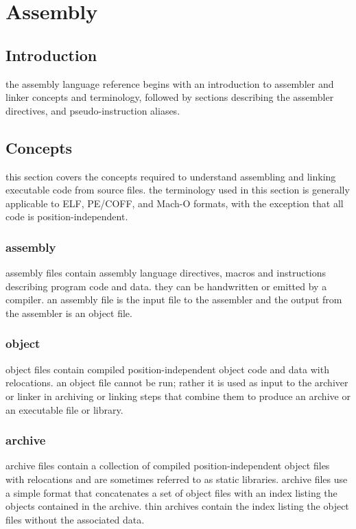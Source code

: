 \chapter{Assembly}
\label{sec:assembly-reference}

\section{Introduction}

the assembly language reference begins with an introduction to
assembler and linker concepts and terminology, followed by sections
describing the assembler directives, and pseudo-instruction aliases.

\section{Concepts}
this section covers the concepts required to understand assembling and
linking executable code from source files. the terminology used in this
section is generally applicable to ELF, PE/COFF, and Mach-O formats, with
the exception that all code is position-independent.

\subsection{assembly}
assembly files contain assembly language directives, macros and
instructions describing program code and data. they can be handwritten
or emitted by a compiler. an assembly file is the input file to the
assembler and the output from the assembler is an object file.

\subsection{object}
object files contain compiled position-independent object code and data with
relocations. an object file cannot be run; rather it is used as input
to the archiver or linker in archiving or linking steps that combine them
to produce an archive or an executable file or library.

\subsection{archive}
archive files contain a collection of compiled position-independent object
files with relocations and are sometimes referred to as static libraries.
archive files use a simple format that concatenates a set of object
files with an index listing the objects contained in the archive.
thin archives contain the index listing the object files without
the associated data.

